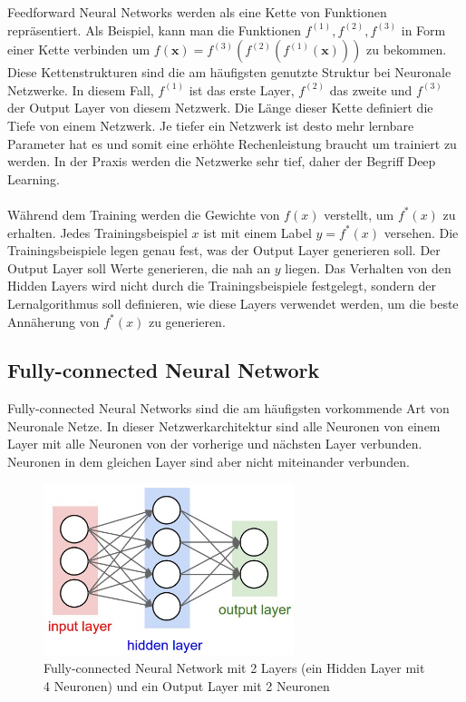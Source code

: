 Feedforward Neural Networks werden als eine Kette von Funktionen repräsentiert. Als Beispiel,
kann man die Funktionen $ f^{(1)}, f^{(2)}, f^{(3)} $ in Form einer Kette verbinden um $ f(\textbf{x}) = f^{(3)}(f^{(2)}(f^{(1)}(\textbf{x}))) $
zu bekommen. Diese Kettenstrukturen sind die am häufigsten genutzte Struktur bei Neuronale Netzwerke. In diesem Fall, $ f^{(1)} $ ist das 
erste Layer, $ f^{(2)} $ das zweite und $ f^{(3)} $ der Output Layer von diesem Netzwerk. Die Länge dieser Kette definiert die Tiefe von
einem Netzwerk. Je tiefer
ein Netzwerk ist desto mehr lernbare Parameter hat es und somit eine erhöhte Rechenleistung braucht um trainiert zu werden.
In der Praxis werden die Netzwerke sehr tief, daher der Begriff Deep Learning.
\\
\\
Während dem Training werden die Gewichte von $ f(x) $ verstellt, um $ f^*(x) $ zu erhalten. Jedes Trainingsbeispiel $ x $ ist mit einem Label
$ y = f^*(x)$ versehen. Die Trainingsbeispiele legen genau fest, was der Output Layer generieren soll. Der Output Layer soll Werte generieren,
die nah an $ y $ liegen. Das Verhalten von den Hidden Layers wird nicht durch die Trainingsbeispiele festgelegt, sondern der Lernalgorithmus
soll definieren, wie diese Layers verwendet werden, um die beste Annäherung von $ f^*(x) $ zu generieren.

\subsection{Fully-connected Neural Network}
Fully-connected Neural Networks sind die am häufigsten vorkommende Art von Neuronale Netze. In dieser Netzwerkarchitektur sind alle Neuronen
von einem Layer mit alle Neuronen von der vorherige und nächsten Layer verbunden. Neuronen in dem gleichen Layer sind aber nicht miteinander verbunden.
\cite{cs231-neural-networks}

\begin{figure}[H]
  \centering
  \includegraphics[width=0.65\textwidth]{resources/nn/neural_net.jpeg}
  \caption{
    Fully-connected Neural Network mit 2 Layers (ein Hidden Layer mit 4 Neuronen) und ein Output Layer mit 2 Neuronen 
    \cite{fully-connected-neural-network}
  }
  \label{image:neuronal-network}
\end{figure}


